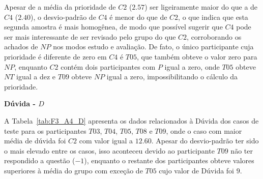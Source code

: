 Apesar de a média da prioridade de $C2$ ($2.57$) ser ligeiramente maior do que a de $C4$ ($2.40$), o desvio-padrão de $C4$ é menor do que de $C2$, o que indica que esta segunda amostra é mais homogênea, de modo que possível sugerir que $C4$ pode ser mais interessante de ser revisado pelo grupo do que $C2$, corroborando os achados de $NP$ nos modos estudo e avaliação. De fato, o único participante cuja prioridade é diferente de zero em $C4$ é $T05$, que também obteve o valor zero para $NP$, enquanto $C2$ contém dois participantes com $P$ igual a zero, onde $T05$ obteve $NT$ igual a dez e $T09$ obteve $NP$ igual a zero, impossibilitando o cálculo da prioridade.

\textbf{Dúvida - $D$}

A Tabela~\ref{tab:F3_A4_D} apresenta os dados relacionados à Dúvida dos casos de teste para os participantes $T03$, $T04$, $T05$, $T08$ e $T09$, onde o caso com maior média de dúvida foi $C2$ com valor igual a $12.60$. Apesar do desvio-padrão ter sido o mais elevado entre os casos, isso aconteceu devido ao participante $T09$ não ter respondido a questão ($-1$), enquanto o restante dos participantes obteve valores superiores à média do grupo com exceção de $T05$ cujo valor de Dúvida foi $9$.


